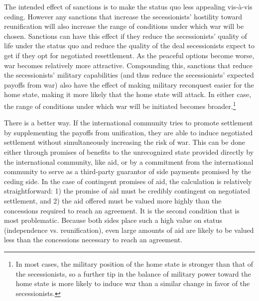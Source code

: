 \documentclass[12pt,letterpaper, notitlepage]{article}
\begin{document}
The intended effect of sanctions is to make the status quo less appealing vis-\`{a}-vis ceding. However any sanctions that increase the secessionists' hostility toward reunification will also increase the range of conditions under which war will be chosen.  Sanctions can have this effect if they reduce the secessionists' quality of life under the status quo %
and reduce the quality of the deal secessionists expect to get if they opt for negotiated resettlement. As the peaceful options become worse, war becomes relatively more attractive.
 Compounding this, sanctions that reduce the secessionists' military capabilities (and thus reduce the secessionists' expected payoffs from war) also have the effect of making military reconquest easier for the home state, making it more likely that the home state will attack. In either case, the range of conditions under which war will be initiated becomes broader.\footnote{In most cases, the military position of the home state is stronger than that of the secessionists, so a further tip in the balance of military power toward the home state is more likely to induce war than a similar change in favor of the secessionists.}


There is a better way. If the international community tries to promote settlement by supplementing the payoffs from unification, they are able to induce negotiated settlement without simultaneously increasing the risk of war. This can be done either through promises of benefits to the unrecognized state provided directly by the international community, like aid, or by a commitment from the international community to serve as a third-party guarantor of side payments promised by the ceding side. In the case of contingent promises of aid, the calculation is relatively straightforward: 1) the promise of aid must be credibly contingent on negotiated settlement, and 2) the aid offered must be valued more highly than the concessions required to reach an agreement. It is the second condition that is most problematic. Because both sides place such a high value on status (independence vs. reunification), even large amounts of aid are likely to be valued less than the concessions necessary to reach an agreement.
\end{document}
